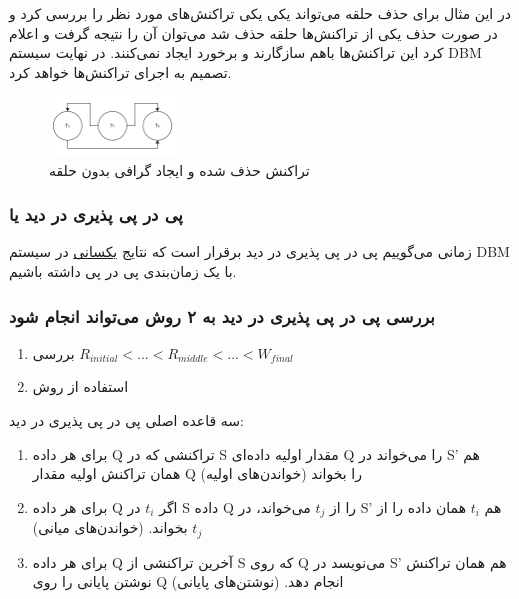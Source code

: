 در این مثال برای حذف حلقه می‌تواند یکی یکی تراکنش‌های مورد نظر را بررسی کرد و در
صورت حذف یکی از تراکنش‌ها حلقه حذف شد می‌توان آن را نتیجه گرفت و اعلام کرد این
تراکنش‌ها باهم سازگارند و برخورد ایجاد نمی‌کنند. در نهایت سیستم DBM تصمیم به
اجرای تراکنش‌ها خواهد کرد.

\begin{figure}[H]
    \centering
    \includegraphics[width=0.3\textwidth]{umls/exp1_solved.jpg}
    \caption{تراکنش حذف شده و ایجاد گرافی بدون حلقه}
    \label{fig: diagram}
\end{figure}

\subsubsection{پی در پی پذیری در دید یا }

زمانی می‌گوییم پی در پی پذیری در دید برقرار است که نتایج \underline{یکسانی} در
سیستم DBM با یک زمان‌بندی پی در پی داشته باشیم.

\subsubsection*{بررسی پی در پی پذیری در دید به ۲ روش می‌تواند انجام شود}

\begin{enumerate}
    \item بررسی $R_{initial}<...<R_{middle}<...<W_{final}$
    \item استفاده از روش 
\end{enumerate}

سه قاعده اصلی پی در پی پذیری در دید:

\begin{enumerate}
    \item برای هر داده Q تراکنشی که در S مقدار اولیه داده‌ای Q  را می‌خواند در
    S' هم همان تراکنش اولیه مقدار Q را بخواند (خواندن‌های اولیه)
    \item برای هر داده‌ Q اگر $t_{i}$ در S داده‌ Q را از $t_{j}$ می‌خواند، در S'
    هم $t_{i}$ همان داده‌ را از $t_{j}$ بخواند. (خواندن‌های میانی)
    \item برای هر داده Q آخرین تراکنشی از S که روی Q می‌نویسد در S' هم همان
    تراکنش نوشتن پایانی را روی Q انجام دهد. (نوشتن‌های پایانی)
\end{enumerate}

